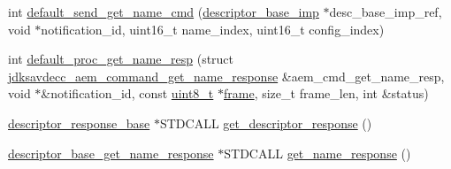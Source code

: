 \begin{DoxyCompactItemize}
\item 
int \hyperlink{classavdecc__lib_1_1descriptor__base__imp_a92f2c88d261418872a496a8145800751}{default\+\_\+send\+\_\+get\+\_\+name\+\_\+cmd} (\hyperlink{classavdecc__lib_1_1descriptor__base__imp}{descriptor\+\_\+base\+\_\+imp} $\ast$desc\+\_\+base\+\_\+imp\+\_\+ref, void $\ast$notification\+\_\+id, uint16\+\_\+t name\+\_\+index, uint16\+\_\+t config\+\_\+index)
\item 
int \hyperlink{classavdecc__lib_1_1descriptor__base__imp_acc8b1c1591bd54bc9a2d21d4f0db2e86}{default\+\_\+proc\+\_\+get\+\_\+name\+\_\+resp} (struct \hyperlink{structjdksavdecc__aem__command__get__name__response}{jdksavdecc\+\_\+aem\+\_\+command\+\_\+get\+\_\+name\+\_\+response} \&aem\+\_\+cmd\+\_\+get\+\_\+name\+\_\+resp, void $\ast$\&notification\+\_\+id, const \hyperlink{stdint_8h_aba7bc1797add20fe3efdf37ced1182c5}{uint8\+\_\+t} $\ast$\hyperlink{gst__avb__playbin_8c_ac8e710e0b5e994c0545d75d69868c6f0}{frame}, size\+\_\+t frame\+\_\+len, int \&status)
\item 
\hyperlink{classavdecc__lib_1_1descriptor__response__base}{descriptor\+\_\+response\+\_\+base} $\ast$S\+T\+D\+C\+A\+LL \hyperlink{classavdecc__lib_1_1descriptor__base__imp_a8c64c9df60afbc144cf24eab5a42c009}{get\+\_\+descriptor\+\_\+response} ()
\item 
\hyperlink{classavdecc__lib_1_1descriptor__base__get__name__response}{descriptor\+\_\+base\+\_\+get\+\_\+name\+\_\+response} $\ast$S\+T\+D\+C\+A\+LL \hyperlink{classavdecc__lib_1_1descriptor__base__imp_abf130a286ee3ca9d1f41a7e2abbd0d33}{get\+\_\+name\+\_\+response} ()
\end{DoxyCompactItemize}
